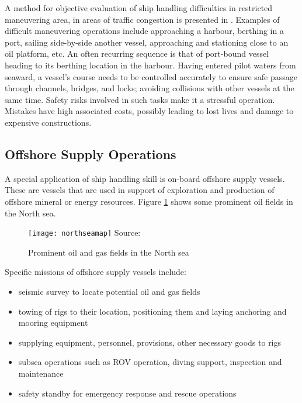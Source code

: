 A method for objective evaluation of ship handling difficulties in restricted maneuvering area, in areas of traffic congestion is presented in \parencite{inoue2000evaluation}. Examples of difficult maneuvering operations include approaching a harbour, berthing in a port, sailing side-by-side another vessel, approaching and stationing close to an oil platform, etc. An often recurring sequence is that of  port-bound vessel heading to its berthing location in the harbour. Having entered pilot waters from seaward, a vessel's course needs to be controlled accurately to ensure safe passage through channels, bridges, and locks; avoiding collisions with other vessels at the same time. Safety risks involved in such tasks make it a stressful operation. Mistakes have high associated costs, possibly leading to lost lives and damage to expensive constructions.

\subsection{Offshore Supply Operations}
A special application of ship handling skill is on-board offshore supply vessels. These are vessels that are used in support of exploration and production of offshore mineral or energy resources. Figure \ref{fig:northseamap} shows some prominent oil fields in the North sea. 
\begin{figure}[h]
	\centering
	\caption{Prominent oil and gas fields in the North sea}
	\texttt{[image: northseamap]}
	\label{fig:northseamap}
	\hbox{\small Source: }
\end{figure}


Specific missions of offshore supply vessels include: 
\begin{itemize}
\item seismic survey to locate potential oil and gas fields
\item towing of rigs to their location, positioning them and laying anchoring and mooring equipment
\item supplying equipment, personnel, provisions, other necessary goods to rigs
\item subsea operations such as ROV operation, diving support, inspection and maintenance
\item safety standby for emergency response and rescue operations
\end{itemize}


